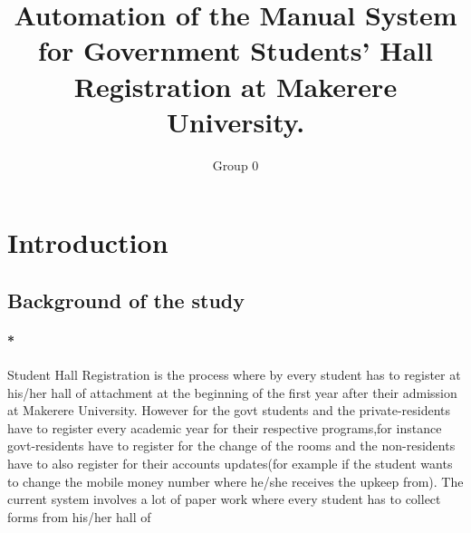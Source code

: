 \documentclass[12pt]{article}
\begin{document}
	\title{Automation of the Manual System for Government Students’ Hall Registration at Makerere University.}
	
	\author{Group 0}
	
	\maketitle
	\section{Introduction}
	\subsection{Background of the study}
	\paragraph{*}
	Student Hall Registration is the process where by every student has to register at his/her hall of attachment at the beginning of the first year after their admission at Makerere University.
	However for the govt students and the private-residents have to register every academic year for their respective programs,for instance govt-residents have to register for the change of the rooms and the non-residents have to also register for their accounts updates(for example if the student wants to change the mobile money number where he/she receives the upkeep from).
	The current system involves a lot of paper work where every student has to collect forms from his/her hall of
\end{document}
